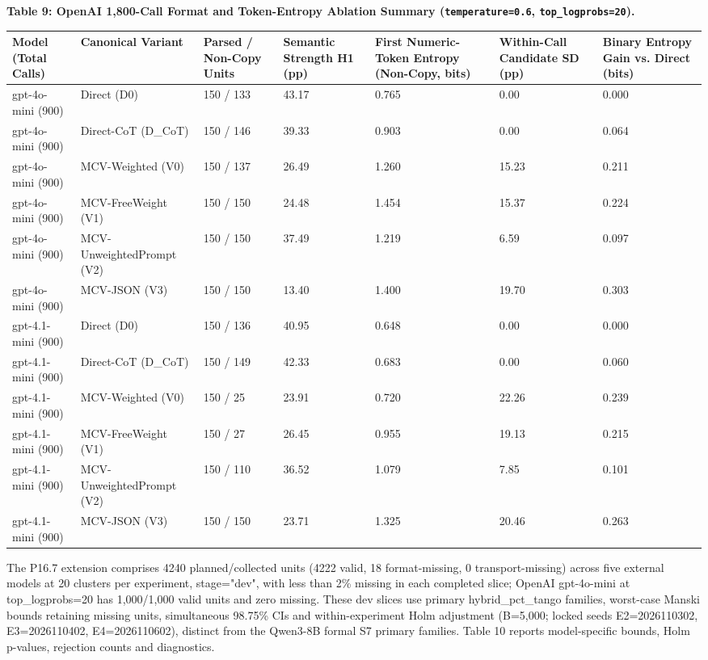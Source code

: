 \documentclass[11pt,a4paper]{article}
\begin{document}
\textbf{Table 9: OpenAI 1,800-Call Format and Token-Entropy Ablation Summary (\texttt{temperature=\allowbreak{}0.6}, \texttt{top\_\allowbreak{}logprobs=\allowbreak{}20}).}

\begin{center}\begingroup\small\setlength{\tabcolsep}{4.5pt}\renewcommand{\arraystretch}{1.12}\begin{adjustbox}{max width=\textwidth}\begin{tabular}{lllllll}\toprule
\textbf{Model (Total Calls)} & \textbf{Canonical Variant} & \textbf{Parsed / Non-Copy Units} & \textbf{Semantic Strength H1 (pp)} & \textbf{First Numeric-Token Entropy (Non-Copy, bits)} & \textbf{Within-Call Candidate SD (pp)} & \textbf{Binary Entropy Gain vs. Direct (bits)} \\ \midrule
gpt-4o-mini (900) & Direct (D0) & 150 / 133 & 43.17 & 0.765 & 0.00 & 0.000 \\
gpt-4o-mini (900) & Direct-CoT (D\_\allowbreak{}CoT) & 150 / 146 & 39.33 & 0.903 & 0.00 & 0.064 \\
gpt-4o-mini (900) & MCV-Weighted (V0) & 150 / 137 & 26.49 & 1.260 & 15.23 & 0.211 \\
gpt-4o-mini (900) & MCV-FreeWeight (V1) & 150 / 150 & 24.48 & 1.454 & 15.37 & 0.224 \\
gpt-4o-mini (900) & MCV-UnweightedPrompt (V2) & 150 / 150 & 37.49 & 1.219 & 6.59 & 0.097 \\
gpt-4o-mini (900) & MCV-JSON (V3) & 150 / 150 & 13.40 & 1.400 & 19.70 & 0.303 \\
gpt-4.1-mini (900) & Direct (D0) & 150 / 136 & 40.95 & 0.648 & 0.00 & 0.000 \\
gpt-4.1-mini (900) & Direct-CoT (D\_\allowbreak{}CoT) & 150 / 149 & 42.33 & 0.683 & 0.00 & 0.060 \\
gpt-4.1-mini (900) & MCV-Weighted (V0) & 150 / 25 & 23.91 & 0.720 & 22.26 & 0.239 \\
gpt-4.1-mini (900) & MCV-FreeWeight (V1) & 150 / 27 & 26.45 & 0.955 & 19.13 & 0.215 \\
gpt-4.1-mini (900) & MCV-UnweightedPrompt (V2) & 150 / 110 & 36.52 & 1.079 & 7.85 & 0.101 \\
gpt-4.1-mini (900) & MCV-JSON (V3) & 150 / 150 & 23.71 & 1.325 & 20.46 & 0.263 \\
\bottomrule\end{tabular}\end{adjustbox}\endgroup\end{center}


The P16.7 extension comprises 4240 planned/collected units (4222 valid, 18 format-missing, 0 transport-missing) across five external models at 20 clusters per experiment, stage="dev", with less than 2\% missing in each completed slice; OpenAI gpt-4o-mini at top\_\allowbreak{}logprobs=20 has 1,000/1,000 valid units and zero missing. These dev slices use primary hybrid\_\allowbreak{}pct\_\allowbreak{}tango families, worst-case Manski bounds retaining missing units, simultaneous 98.75\% CIs and within-experiment Holm adjustment (B=5,000; locked seeds E2=2026110302, E3=2026110402, E4=2026110602), distinct from the Qwen3-8B formal S7 primary families. Table 10 reports model-specific bounds, Holm p-values, rejection counts and diagnostics.
\end{document}
